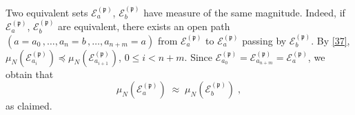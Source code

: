 \documentclass[reqno]{amsart}
\begin{document}
Two equivalent sets ${{\mathcal E}}^{({{\mathfrak p}})}_a$, ${{\mathcal E}}^{({{\mathfrak p}})}_b$ have
measure of the same magnitude. Indeed, if ${{\mathcal E}}^{({{\mathfrak p}})}_a$, ${{\mathcal E}}^{({{\mathfrak p}})}_b$ are equivalent, there exists an open path $(a=a_0\, ,
\dots, a_n = b\, , \dots, a_{n+m}=a)$ from ${{\mathcal E}}^{({{\mathfrak p}})}_a$ to ${{\mathcal E}}^{({{\mathfrak p}})}_a$ passing by ${{\mathcal E}}^{({{\mathfrak p}})}_b$. By \eqref{37},
$\mu_N({{\mathcal E}}^{({{\mathfrak p}})}_{a_i}) \preceq \mu_N({{\mathcal E}}^{({{\mathfrak p}})}_{a_{i+1}})$, $0\le i <n+m$. Since ${{\mathcal E}}^{({{\mathfrak p}})}_{a_0} = {{\mathcal E}}^{({{\mathfrak p}})}_{a_{n+m}} = {{\mathcal E}}^{({{\mathfrak p}})}_a$, we obtain that
\begin{equation}
\label{13}
\mu_N({{\mathcal E}}^{({{\mathfrak p}})}_a) \;\approx\; \mu_N({{\mathcal E}}^{({{\mathfrak p}})}_b)\;,
\end{equation}
as claimed.
\end{document}
